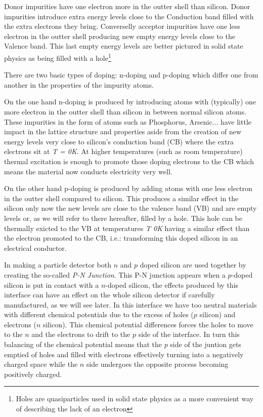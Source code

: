 Donor impurities have one electron more in the outter shell than silicon. Donor impurities introduce extra energy levels close to the Conduction band filled with the extra electrons they bring. Converselly acceptor impurities have one less electron in the outter shell producing new empty energy levels close to the Valence band. This last empty energy levels are better pictured in solid state physics as being filled with a hole\footnote{Holes are quasiparticles used in solid state physics as a more convenient way of describing the lack of an electron}



There are two basic types of doping: n-doping and p-doping which differ one from another in the properties of the impurity atoms.

On the one hand n-doping is produced by introducing atoms with (typically) one more electron in the outter shell than silicon in between normal silicon atoms. These impurities in the form of atoms such as Phosphorus, Arsenic... have little impact in the lattice structure and properties aside from the creation of new energy levels very close to silicon’s conduction band (CB) where the extra electrons sit at \textit{T = 0K}. At higher temperatures (such as room temperature) thermal excitation is enough to promote those doping electrons to the CB which means the material now conducts electricity very well.

On the other hand p-doping is produced by adding atoms with one less electron in the outter shell compared to silicon. This produces a similar effect in the silicon only now the new levels are close to the valence band (VB) and are empty levels or, as we will refer to there hereafter, filled by a hole. This hole can be thermally exicted to the VB at temperatures \textit{T \beq 0K} having a similar effect than the electron promoted to the CB, i.e.: transforming this doped silicon in an electrical conductor.

In making a particle detector both $n$ and $p$ doped silicon are used together by creating the so-called \textit{P-N Junction}. This P-N junction appears when a $p$-doped silicon is put in contact with a $n$-doped silicon, the effects produced by this interface can have an effect on the whole silicon detector if carefully manufactured, as we will see later. In this interface we have too neutral materials with different chemical potentials due to the excess of holes ($p$ silicon) and electrons ($n$ silicon). This chemical potential differences forces the holes to move to the $n$ and the electrons to drift to the $p$ side of the interface. In turn this balancing of the chemical potential means that the $p$ side of the juntion gets emptied of holes and filled with electrons effectively turning into a negatively charged space while the $n$ side undergoes the opposite process becoming positively charged.

